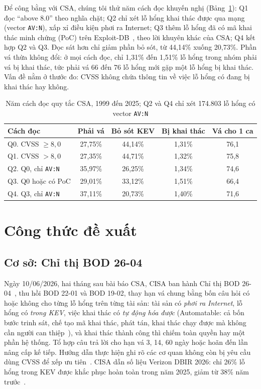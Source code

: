 \documentclass[conference]{IEEEtran}
\begin{document}
Để công bằng với CSA, chúng tôi thử năm cách đọc khuyến nghị (Bảng~\ref{tab:donhay}): Q1 đọc ``above 8.0'' theo
nghĩa chặt; Q2 chỉ xét lỗ hổng khai thác được qua mạng (vector \texttt{AV:N}), xấp xỉ điều kiện phơi ra Internet; Q3
thêm lỗ hổng đã có mã khai thác minh chứng (PoC) trên Exploit-DB~\cite{exploitdb}, theo lời khuyên khác của CSA; Q4
kết hợp Q2 và Q3. Đọc sát hơn chỉ giảm phần bỏ sót, từ 44,14\% xuống 20,73\%. Phần vá thừa không đổi: ở mọi cách đọc,
chỉ 1,31\% đến 1,51\% lỗ hổng trong nhóm phải vá bị khai thác, tức phải vá 66 đến 76 lỗ hổng mới gặp một lỗ hổng bị
khai thác. Vấn đề nằm ở thước đo: CVSS không chứa thông tin về việc lỗ hổng có đang bị khai thác hay không.

\begin{table}[htbp]
\caption{Năm cách đọc quy tắc CSA, 1999 đến 2025; Q2 và Q4 chỉ xét 174.803 lỗ hổng có vector \texttt{AV:N}}\label{tab:donhay}
\centering
\footnotesize
\setlength{\tabcolsep}{3pt}
\begin{tabular}{lcccc}
\toprule
Cách đọc & Phải vá & Bỏ sót KEV & Bị khai thác & Vá cho 1 ca \\
\midrule
Q0. CVSS $\ge 8{,}0$ & 27,75\% & 44,14\% & 1,31\% & 76,1 \\
Q1. CVSS $> 8{,}0$ & 27,35\% & 44,71\% & 1,32\% & 75,8 \\
Q2. Q0, chỉ \texttt{AV:N} & 35,97\% & 26,25\% & 1,34\% & 74,6 \\
Q3. Q0 hoặc có PoC & 29,01\% & 33,12\% & 1,51\% & 66,4 \\
Q4. Q3, chỉ \texttt{AV:N} & 37,11\% & 20,73\% & 1,40\% & 71,6 \\
\bottomrule
\end{tabular}
\end{table}

\section{Công thức đề xuất}\label{sec:giaiphap}

\subsection{Cơ sở: Chỉ thị BOD 26-04}
Ngày 10/06/2026, hai tháng sau bài báo CSA, CISA ban hành Chỉ thị BOD 26-04~\cite{bod2604}, thu hồi BOD 22-01 và BOD
19-02, thay hạn vá chung bằng bốn câu hỏi có hoặc không cho từng lỗ hổng trên từng tài sản: tài sản có \emph{phơi ra
Internet}, lỗ hổng có \emph{trong KEV}, việc khai thác có \emph{tự động hóa được} (Automatable: cả bốn bước trinh
sát, chế tạo mã khai thác, phát tán, khai thác chạy được mà không cần người can thiệp~\cite{ssvcauto}), và khai
thác thành công thì chiếm toàn quyền hay một phần hệ thống. Tổ hợp câu trả lời cho hạn vá 3, 14, 60 ngày hoặc hoãn
đến lần nâng cấp kế tiếp. Hướng dẫn thực hiện ghi rõ các cơ quan không còn bị yêu cầu dùng CVSS để xếp ưu
tiên~\cite{bod2604ig}. CISA dẫn số liệu Verizon DBIR 2026: chỉ 26\% lỗ hổng trong KEV được khắc phục hoàn toàn trong
năm 2025, giảm từ 38\% năm trước~\cite{cisablog2026,dbir2026}.
\end{document}
